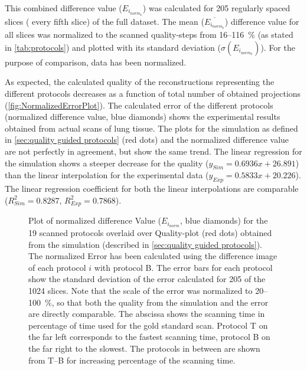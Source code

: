 This combined difference value ($E_{i_{norm_{k}}}$) was calculated for 205 regularly spaced slices (%
every fifth slice) of the full dataset. The mean ($\overline{E_{i_{norm_{k}}}}$) difference value for all slices was normalized to the scanned quality-steps from 16--\SI{116}{\percent} (as stated in \autoref{tab:protocols}) and plotted with its standard deviation ($\sigma(E_{i_{norm_{k}}})$). For the purpose of comparison, data has been normalized.

As expected, the calculated quality of the reconstructions representing the different protocols decreases as a function of total number of obtained projections (\autoref{fig:NormalizedErrorPlot}). The calculated error of the different protocols (normalized difference value, blue diamonds) shows the experimental results obtained from actual scans of lung tissue. The plots for the simulation as defined in \autoref{sec:quality guided protocols} (red dots) and the normalized difference value are not perfectly in agreement, but show the same trend. The linear regression for the simulation shows a steeper decrease for the quality ($y_{Sim}=0.6936x+26.891$) than the linear interpolation for the experimental data ($y_{Exp}=0.5833x+20.226$). The linear regression coefficient for both the linear interpolations are comparable ($R^{2}_{Sim}=0.8287$, $R^{2}_{Exp}=0.7868$).

\begin{figure}[htb]%
	\noindent\makebox[\textwidth]{%
	}%
	\caption[Plot normalized difference value]{Plot of normalized difference Value ($E_{i_{norm}}$, blue diamonds) for the 19 scanned protocols overlaid over Quality-plot (red dots) obtained from the simulation (described in \autoref{sec:quality guided protocols}). The normalized Error has been calculated using the difference image of each protocol $i$ with protocol B. The error bars for each protocol show the standard deviation of the error calculated for 205 of the 1024 slices. Note that the scale of the error was normalized to 20--\SI{100}{\percent}, so that both the quality from the simulation and the error are directly comparable. The abscissa shows the scanning time in percentage of time used for the gold standard scan. Protocol T on the far left corresponds to the fastest scanning time, protocol B on the far right to the slowest. The protocols in between are shown from T--B for increasing percentage of the scanning time.}%
	\label{fig:NormalizedErrorPlot}%
\end{figure}%

